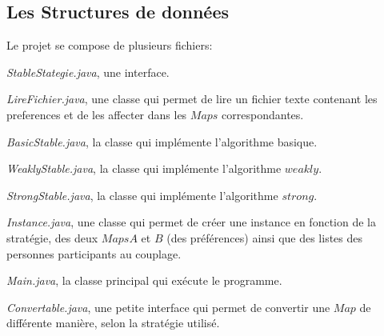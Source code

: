 \documentclass[11pt]{article}
\begin{document}
\subsection{Les Structures de données}
Le projet se compose de plusieurs fichiers: 

\begin{list}{•}{}
\item \emph{StableStategie.java}, une interface.
\item \emph{LireFichier.java}, une classe qui permet de lire un fichier texte contenant les preferences et de les affecter dans les $Maps$ correspondantes.
\item \emph{BasicStable.java}, la classe qui implémente l'algorithme basique.
\item \emph{WeaklyStable.java}, la classe qui implémente l'algorithme $weakly$.
\item \emph{StrongStable.java}, la classe qui implémente l'algorithme $strong$.
\item \emph{Instance.java}, une classe qui permet de créer une instance en fonction de la stratégie, des deux $Maps A$ et $B$ (des préférences) ainsi que des listes des personnes participants au couplage.
\item \emph{Main.java}, la classe principal qui exécute le programme.
\item \emph{Convertable.java}, une petite interface qui permet de convertir une $Map$ de différente manière, selon la stratégie utilisé.
\end{list}
\end{document}
